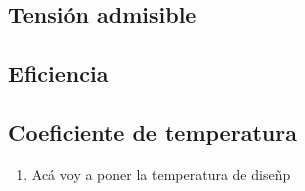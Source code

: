\subsection{Tensión admisible}

\subsection{Eficiencia}

\subsection{Coeficiente de temperatura}

\begin{enumerate}
     \item Acá voy a poner la temperatura de diseñp
\end{enumerate}

























